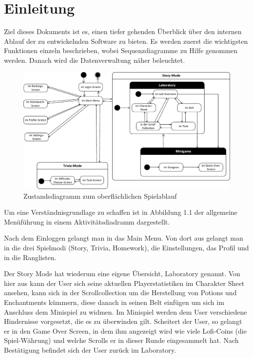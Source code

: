 
\chapter{Einleitung}
Ziel dieses Dokuments ist es, einen tiefer gehenden Überblick über den internen Ablauf der zu entwickelnden Software zu bieten. Es werden zuerst die wichtigsten Funktionen einzeln beschrieben, wobei Sequenzdiagramme zu Hilfe genommen werden. Danach wird die Datenverwaltung näher beleuchtet. \\

\begin{figure}[h]
\includegraphics[width=1.0\textwidth]{figures/statechart_game.pdf}
\caption{Zustandsdiagramm zum oberflächlichen Spielablauf}
\label{sequence}
\end{figure}


Um eine Verständnisgrundlage zu schaffen ist in Abbildung 1.1 der allgemeine Men\"uf\"uhrung in einem Aktivit\"atsdiadramm dargestellt. 


Nach dem Einloggen gelangt man in das Main Menu. Von dort aus gelangt man in die drei Spielmodi (Story, Trivia, Homework), die Einstellungen, das Profil und in die Ranglisten.

Der Story Mode hat wiederum eine eigene Übersicht, Laboratory genannt. Von hier aus kann der User sich seine aktuellen Playerstatistiken im Charakter Sheet ansehen, kann sich in der Scrollcollection um die Herstellung von Potions und Enchantments k\"ummern, diese danach in seinen Belt einf\"ugen um sich im Anschluss dem Minispiel zu widmen. Im Minispiel werden dem User verschiedene Hindernisse vorgesetzt, die es zu überwinden gilt. Scheitert der User, so gelangt er in den Game Over Screen, in dem ihm angezeigt wird wie viele Lofi-Coins (die Spiel-Währung) und welche Scrolls er in dieser Runde eingesammelt hat. Nach Bestätigung befindet sich der User zurück im Laboratory.

